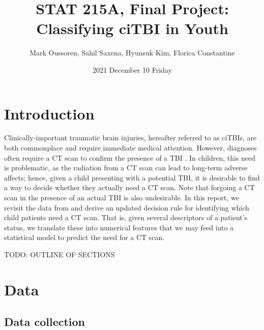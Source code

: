 \documentclass[11pt, letterpaper]{amsart}
\title{STAT 215A, Final Project: Classifying ciTBI in Youth}
\author{Mark Oussoren, Sahil Saxena, Hyunsuk Kim, Florica Constantine}
\date{2021 December 10 Friday}
\let\Oldsection\section
\renewcommand{\section}{\FloatBarrier\Oldsection}
\let\Oldsubsection\subsection
\renewcommand{\subsection}{\FloatBarrier\Oldsubsection}
\begin{document}
\maketitle

\section{Introduction}


Clinically-important traumatic brain injuries, hereafter referred to as ciTBIs, are both commonplace and require immediate medical attention. However, diagnoses often require a CT scan to confirm the presence of a TBI \cite{brenner2002estimating}. In children, this need is problematic, as the radiation from a CT scan can lead to long-term adverse affects; hence, given a child presenting with a potential TBI, it is desirable to find a way to decide whether they actually need a CT scan. Note that forgoing a CT scan in the presence of an actual TBI is also undesirable. In this report, we revisit the data from \cite{kuppermann2009identification} and derive an updated decision rule for identifying which child patients need a CT scan. That is, given several descriptors of a patient's status, we translate these into numerical features that we may feed into a statistical model to predict the need for a CT scan. 

TODO: OUTLINE OF SECTIONS

\section{Data}

\subsection{Data collection}

\end{document}
